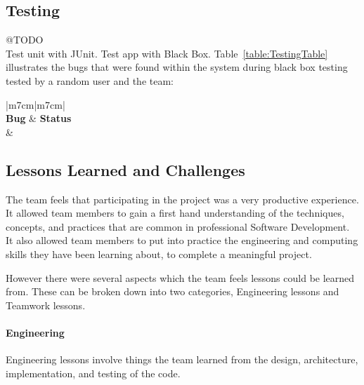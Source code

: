 \documentclass[11pt]{article}
\begin{document}
{\subsection{Testing} 
@TODO
\\Test unit with JUnit. Test app with Black Box. 
Table~\ref{table:TestingTable} illustrates the bugs that were found within the system during black box testing tested by a random user and the team:
\begin{center}
	\begin{table}[!htb]
	\begin{tabular}{|m{7cm}|m{7cm}|}
		 \hline
		 \\ 
		\hline 
		 \centering \textbf{Bug} & \textbf{Status}\\\hline
		 &  \\  \hline
		
	\end{tabular}
	\caption{Testing Table}
		\label{table:TestingTable}
	\end{table}
\end{center}

\pagebreak
\subsection{Lessons Learned and Challenges}

The team feels that participating in the project was a very productive experience. It allowed team members to gain a first hand understanding of the techniques, concepts, and practices that are common in professional Software Development. It also allowed team members to put into practice the engineering and computing skills they have been learning about, to complete a meaningful project. 

However there were several aspects which the team feels lessons could be learned from.
These can be broken down into two categories, Engineering lessons and Teamwork lessons.

\paragraph{Engineering}

Engineering lessons involve things the team learned from the design, architecture, implementation, and testing of the code.

}
\end{document}
